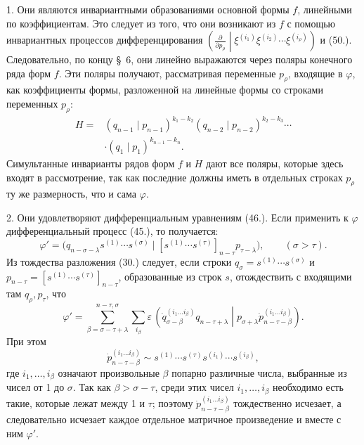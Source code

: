 \documentclass[11pt]{article}
\newcommand{\pair}[2]{\left(#1\middle|#2\right)}
\newcommand{\eps}{\varepsilon}
\begin{document}
1. Они являются инвариантными образованиями основной формы $f$, линейными по коэффициентам. Это следует из того, что они возникают из $f$ с помощью инвариантных процессов дифференцирования
$\left(\frac{\partial}{\partial p_\rho}\middle|\xi^{(i_1)}\xi^{(i_2)}\cdots\xi^{(i_\rho)}\right)$ и (50.). Следовательно, по концу \S\ 6, они линейно выражаются через поляры конечного ряда форм $f$. Эти поляры получают, рассматривая переменные $p_\rho$, входящие в $\varphi$, как коэффициенты формы, разложенной на линейные формы со строками переменных $p_\rho$:
\begin{equation}
\begin{aligned}
 H={}&(q_{n-1}\mid p_{n-1})^{k_1-k_2}
(q_{n-2}\mid p_{n-2})^{k_2-k_3}\cdots\\
&\cdot(q_1\mid p_1)^{k_{n-1}-k_n}.
\end{aligned}
\tag{52}
\end{equation}
Симультанные инварианты рядов форм $f$ и $H$ дают все поляры, которые здесь входят в рассмотрение, так как последние должны иметь в отдельных строках $p_\rho$ ту же размерность, что и сама $\varphi$.

2. Они удовлетворяют дифференциальным уравнениям (46.). Если применить к $\varphi$ дифференциальный процесс (45.), то получается:
\[
 \varphi'=\bigl(q_{n-\sigma-\lambda}s^{(1)}\cdots s^{(\sigma)}\mid [s^{(1)}\cdots s^{(\tau)}]_{n-\tau}p_{\tau-\lambda}\bigr),\qquad (\sigma>\tau).
\]
Из тождества разложения (30.) следует, если строки $q_\sigma=s^{(1)}\cdots s^{(\sigma)}$ и $p_{n-\tau}=[s^{(1)}\cdots s^{(\tau)}]_{n-\tau}$, образованные из строк $s$, отождествить с входящими там $q_\rho,p_\tau$, что
\[
 \varphi'=\sum_{\beta=\sigma-\tau+\lambda}^{n-\tau,\sigma}\sum_{i_\beta}\eps\,
 \pair{\dot{q}_{\sigma-\beta}^{(i_1\ldots i_\beta)}q_{n-\tau+\lambda}}{p_{\sigma+\lambda}\dot{p}_{n-\tau-\beta}^{(i_1\ldots i_\beta)}}.
\]
При этом
\[
 \dot{p}_{n-\tau-\beta}^{(i_1\ldots i_\beta)}\sim s^{(1)}\cdots s^{(\tau)}s^{(i_1)}\cdots s^{(i_\beta)},
\]
где $i_1,\ldots,i_\beta$ означают произвольные $\beta$ попарно различные числа, выбранные из чисел от 1 до $\sigma$. Так как $\beta>\sigma-\tau$, среди этих чисел $i_1,\ldots,i_\beta$ необходимо есть такие, которые лежат между 1 и $\tau$; поэтому $\dot{p}_{n-\tau-\beta}^{(i_1\ldots i_\beta)}$ тождественно исчезает, а следовательно исчезает каждое отдельное матричное произведение и вместе с ним $\varphi'$.
\end{document}
